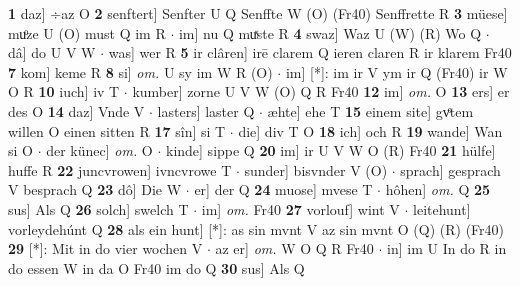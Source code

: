 \documentclass[8pt,a4paper,notitlepage]{article}
\begin{document}
\begin{table}[ht]
\begin{minipage}[t]{0.5\linewidth}
\textbf{1} daz] ÷az O \textbf{2} senftert] Senfter U Q Senffte W (O) (Fr40) Senffrette R \textbf{3} müese] muͦze U (O) must Q im R  $\cdot$ im] nu Q muͯste R \textbf{4} swaz] Waz U (W) (R) Wo Q  $\cdot$ dâ] do U V W  $\cdot$ was] wer R \textbf{5} ir clâren] irē clarem Q ieren claren R ir klarem Fr40 \textbf{7} kom] keme R \textbf{8} si] \textit{om.} U sy im W R (O)  $\cdot$ im] [*]: im ir V ym ir Q (Fr40) ir W O R \textbf{10} iuch] iv T  $\cdot$ kumber] zorne U V W (O) Q R Fr40 \textbf{12} im] \textit{om.} O \textbf{13} ers] er des O \textbf{14} daz] Vnde V  $\cdot$ lasters] laster Q  $\cdot$ æhte] ehe T \textbf{15} einem site] gvͦtem willen O einen sitten R \textbf{17} sîn] si T  $\cdot$ die] div T O \textbf{18} ich] och R \textbf{19} wande] Wan si O  $\cdot$ der künec] \textit{om.} O  $\cdot$ kinde] sippe Q \textbf{20} im] ir U V W O (R) Fr40 \textbf{21} hülfe] huffe R \textbf{22} juncvrowen] ivncvrowe T  $\cdot$ sunder] bisvnder V (O)  $\cdot$ sprach] gesprach V besprach Q \textbf{23} dô] Die W  $\cdot$ er] der Q \textbf{24} muose] mvese T  $\cdot$ hôhen] \textit{om.} Q \textbf{25} sus] Als Q \textbf{26} solch] swelch T  $\cdot$ im] \textit{om.} Fr40 \textbf{27} vorlouf] wint V  $\cdot$ leitehunt] vorleydehúnt Q \textbf{28} als ein hunt] [*]: as sin mvnt V az sin mvnt O (Q) (R) (Fr40) \textbf{29} [*]: Mit in do vier wochen V  $\cdot$ az er] \textit{om.} W O Q R Fr40  $\cdot$ in] im U In do R in do essen W in da O Fr40 im do Q \textbf{30} sus] Als Q \newline
\end{minipage}
\end{table}
\end{document}
